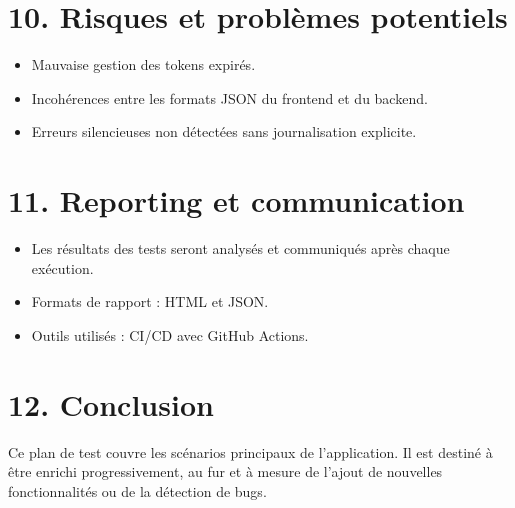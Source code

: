 \documentclass[a4paper,12pt]{article}
\begin{document}
\section*{10. Risques et problèmes potentiels}
\begin{itemize}
    \item Mauvaise gestion des tokens expirés.
    \item Incohérences entre les formats JSON du frontend et du backend.
    \item Erreurs silencieuses non détectées sans journalisation explicite.
\end{itemize}
 
\section*{11. Reporting et communication}
\begin{itemize}
    \item Les résultats des tests seront analysés et communiqués après chaque exécution.
    \item Formats de rapport : HTML et JSON.
    \item Outils utilisés : CI/CD avec GitHub Actions.
\end{itemize}

\section*{12. Conclusion}
Ce plan de test couvre les scénarios principaux de l'application. Il est destiné à être enrichi progressivement, au fur et à mesure de l'ajout de nouvelles fonctionnalités ou de la détection de bugs.
\end{document}
